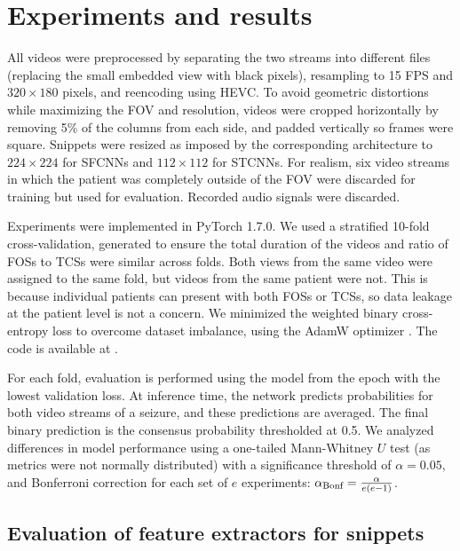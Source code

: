 \section{Experiments and results}

All videos were preprocessed by
separating the two streams into different files (replacing the small embedded view with black pixels),
resampling to 15 \ac{FPS} and $320 \times 180$ pixels,
and reencoding using \ac{HEVC}.
To avoid geometric distortions while maximizing the \ac{FOV} and resolution, videos were cropped horizontally by removing 5\% of the columns from each side, and padded vertically so frames were square.
Snippets were resized as imposed by the corresponding architecture to $224 \times 224$ for \acp{SFCNN} and  $112 \times 112$ for \acp{STCNN}.
For realism, six video streams in which the patient was completely outside of the \ac{FOV} were discarded for training but used for evaluation.
Recorded audio signals were discarded.

Experiments were implemented in PyTorch 1.7.0.
We used a stratified 10-fold cross-validation, generated to ensure the total duration of the videos and ratio of \acp{FOS} to \acp{TCS} were similar across folds.
Both views from the same video were assigned to the same fold, but videos from the same patient were not.
This is because individual patients can present with both \acp{FOS} or \acp{TCS}, so data leakage at the patient level is not a concern.
We minimized the weighted binary cross-entropy loss to overcome dataset imbalance, using the AdamW optimizer \cite{loshchilov_decoupled_2019}.
The code is available at .

For each fold, evaluation is performed using the model from the epoch with the lowest validation loss.
At inference time, the network predicts probabilities for both video streams of a seizure, and these predictions are averaged.
The final binary prediction is the consensus probability thresholded at 0.5.
We analyzed differences in model performance using a one-tailed Mann-Whitney $U$ test (as metrics were not normally distributed) with a significance threshold of $\alpha = 0.05$, and Bonferroni correction for each set of $e$ experiments: $\alpha_{\text{Bonf}} = \frac{\alpha}{e (e - 1)}$.


\subsection{Evaluation of feature extractors for snippets}
\label{sec:exp_feat}

